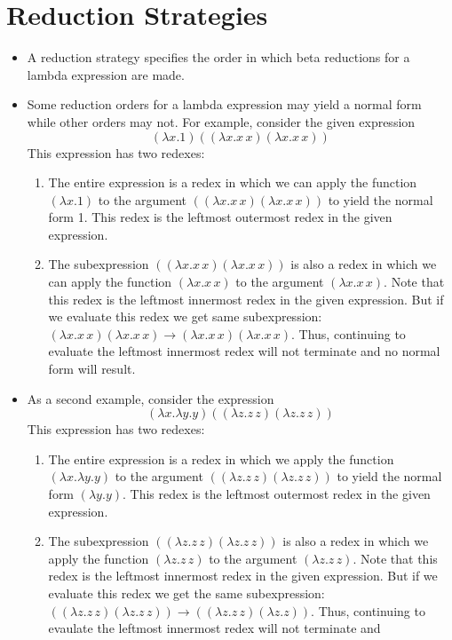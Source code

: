 \documentclass[]{article}
\begin{document}
\section{Reduction Strategies}
\begin{itemize}
\item A reduction strategy specifies the order in which beta reductions for a
lambda expression are made.
\item Some reduction orders for a lambda expression may yield a normal form
while other orders may not. For example, consider the given expression
\[ (\lambda x.1)((\lambda x.x\,x)(\lambda x.x\,x)) \]
This expression has two redexes:
\begin{enumerate}
\item The entire expression is a redex in which we can apply the function
$(\lambda x.1)$ to the argument $((\lambda x.x\,x)(\lambda x.x\,x))$ to yield
the normal form 1. This redex is the leftmost outermost redex in the given
expression.
\item The subexpression $((\lambda x.x\,x)(\lambda x.x\,x))$ is also a redex in
which we can apply the function $(\lambda x.x\,x)$ to the argument $(\lambda
x.x\,x)$. Note that this redex is the leftmost innermost redex in the given
expression. But if we evaluate this redex we get same subexpression: $(\lambda
x.x\,x)(\lambda x.x\,x)\rightarrow(\lambda x.x\,x)(\lambda x.x\,x)$. Thus,
continuing to evaluate the leftmost innermost redex will not terminate and no
normal form will result.
\end{enumerate}
\item As a second example, consider the expression
\[ (\lambda x.\lambda y.y)((\lambda z.z\,z)(\lambda z.z\,z)) \]
This expression has two redexes:
\begin{enumerate}
\item The entire expression is a redex in which we apply the function $(\lambda
x.\lambda y.y)$ to the argument $((\lambda z.z\,z)(\lambda z.z\,z))$ to yield
the normal form $(\lambda y.y)$. This redex is the leftmost outermost redex in
the given expression.
\item The subexpression $((\lambda z.z\,z)(\lambda z.z\,z))$ is also a redex in
which we apply the function $(\lambda z.z\,z)$ to the argument $(\lambda
z.z\,z)$. Note that this redex is the leftmost innermost redex in the given
expression. But if we evaluate this redex we get the same subexpression:
$((\lambda z.z\,z)(\lambda z.z\,z))\rightarrow((\lambda z.z\,z)(\lambda z.z))$.
Thus, continuing to evaulate the leftmost innermost redex will not terminate and

\end{enumerate}
\end{itemize}
\end{document}

